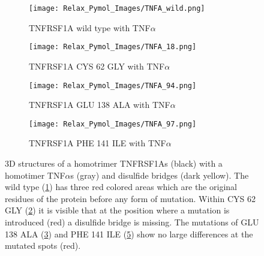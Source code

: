 	\begin{figure}[!ht]
		\centering
		\begin{subfigure}{0.49\textwidth}
			\texttt{[image: Relax\_Pymol\_Images/TNFA\_wild.png]}
			\caption{TNFRSF1A wild type with TNF$\alpha$}
			\label{fig:RES_TNFA_wild}
		\end{subfigure}
		\begin{subfigure}{0.49\textwidth}
			\texttt{[image: Relax\_Pymol\_Images/TNFA\_18.png]}
			\caption{TNFRSF1A CYS 62 GLY with TNF$\alpha$}
			\label{fig:RES_TNFA_18}
		\end{subfigure}
		\par\bigskip
		\begin{subfigure}{0.49\textwidth}
			\texttt{[image: Relax\_Pymol\_Images/TNFA\_94.png]}
			\caption{TNFRSF1A GLU 138 ALA with TNF$\alpha$}
			\label{fig:RES_TNFA_94}
		\end{subfigure}
		\begin{subfigure}{0.49\textwidth}
			\texttt{[image: Relax\_Pymol\_Images/TNFA\_97.png]}
			\caption{TNFRSF1A PHE 141 ILE with TNF$\alpha$}
			\label{fig:RES_TNFA_97}
			\end{subfigure}
		\caption[TNFRSF1A homo trimer with TNF$\alpha$ homo trimers wild type and mutated relaxed models]{3D structures of a homotrimer TNFRSF1As (black) with a homotimer TNF$\alpha$s (gray) and disulfide bridges (dark yellow). The wild type (\ref{fig:RES_TNFA_wild}) has three red colored areas which are the original residues of the protein before any form of mutation. Within CYS 62 GLY (\ref{fig:RES_TNFA_18}) it is visible that at the position where a mutation is introduced (red) a disulfide bridge is missing. The mutations of GLU 138 ALA (\ref{fig:RES_TNFA_94}) and PHE 141 ILE (\ref{fig:RES_TNFA_97}) show no large differences at the mutated spots (red).}
		\end{figure}
		\newpage
		
